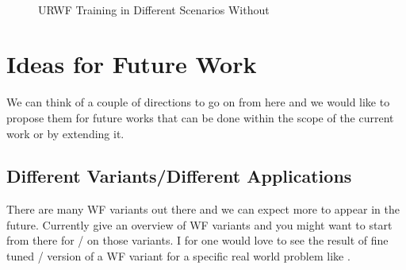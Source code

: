 {{\begin{figure}[!htbp]
  \subfloat[Different Scalars Multiplied by a Single Semi-Positive Definite Matrix$(\tau_k\boldsymbol{S})$, $\mathrm{lr}=1.000\times10^{-3}, \,\mathrm{L}=30$]{}\\
  \caption{\ac{URWF} Training in Different Scenarios Without \optuna\cite{Akiba2019}}
  \label{fig:urwf_training_04_05_06}
  \end{figure}
}




\section*{Ideas for Future Work}\label{sec:ideas_for_future_work}

We can think of a couple of directions to go on from here and we would like to propose them for future works that can be done within the scope of 
the current work or by extending it.

\subsection*{Different Variants/Different Applications}

There are many \ac{WF}\cite{Jaganathan2015}\cite{Liu2019} variants out there and we can expect more to appear in the future. 
Currently \cite{Jaganathan2015}\cite{Liu2019}\cite{Chandra2017} give an overview of \ac{WF} variants and you might want to start from there for 
\du/\au\cite{Monga2019} on those variants. I for one would love to see the result of fine tuned 
\du/\au\cite{Monga2019} version of a \ac{WF} variant for a specific real world problem like \cite{Fogel2013}. 

}

